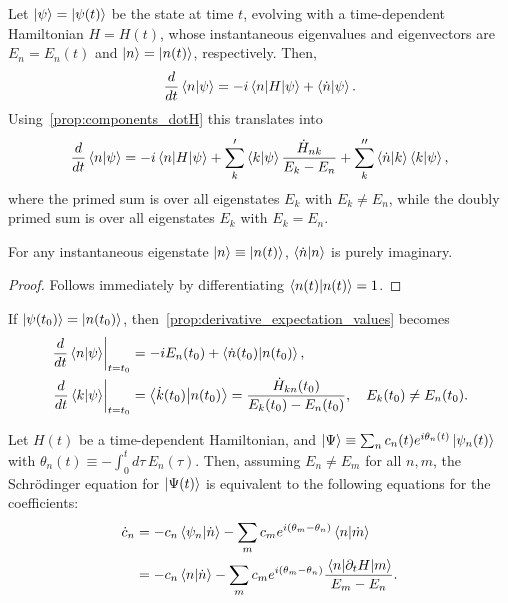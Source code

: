 \documentclass[a4paper]{report}
\begin{document}
\begin{prop}
	Let $\ket\psi=\ket{\psi(t)}$ be the state at time $t$, evolving with a time-dependent Hamiltonian $H=H(t)$, whose instantaneous eigenvalues and eigenvectors are $E_n=E_n(t)$ and $\ket n=\ket{n(t)}$, respectively.
	Then,
	\begin{equation}
		\frac{d}{dt}\braket{n}{\psi} = -i\mel{n}{H}{\psi} + \braket{\dot n}{\psi}.
	\end{equation}
	Using~\cref{prop:components_dotH} this translates into
	\begin{equation}
		\frac{d}{dt}\braket{n}{\psi} =
		- i \mel{n}{H}{\psi}
		+ \sum_k' \braket{k}{\psi} \frac{\dot H_{nk}}{E_k - E_n}
		+ \sum_k'' \braket{\dot n}{k}\braket{k}{\psi},
	\end{equation}
	where the primed sum is over all eigenstates $E_k$ with $E_k\neq E_n$, while the doubly primed sum is over all eigenstates $E_k$ with $E_k=E_n$.
	\label{prop:derivative_expectation_values}
\end{prop}

\begin{prop}
	For any instantaneous eigenstate $\ket n\equiv\ket{n(t)}$, $\braket{\dot n}{n}$ is purely imaginary.
	\label{prop:ndotn_is_purely_imag}
\end{prop}
\begin{proof}
	Follows immediately by differentiating $\braket{n(t)}{n(t)}=1$.
\end{proof}

\begin{prop}
	If $\ket{\psi(t_0)}=\ket{n(t_0)}$, then~\cref{prop:derivative_expectation_values} becomes
	\begin{align}
		\left. \frac{d}{dt}\braket{n}{\psi}\right\rvert_{t=t_0} &= 
		-i E_n(t_0) + \braket{\dot n(t_0)}{n(t_0)}, \\
		\left. \frac{d}{dt}\braket{k}{\psi}\right\rvert_{t=t_0} &= 
		\braket{\dot k(t_0)}{n(t_0)} = \frac{\dot H_{kn}(t_0)}{E_k(t_0)-E_n(t_0)},\quad E_k(t_0)\neq E_n(t_0).
	\end{align}
\end{prop}

\begin{prop}
	Let $H(t)$ be a time-dependent Hamiltonian, and
	$\ket{\Psi}\equiv \sum_n c_n(t)e^{i\theta_n(t)}\ket{\psi_n(t)}$ with
	$\theta_n(t)\equiv-\int_0^t d\tau\,E_n(\tau)$.
	Then, assuming $E_n\neq E_m$ for all $n,m$, the Schr\"{o}dinger equation for $\ket{\Psi(t)}$ is equivalent to the following equations for the coefficients:
	\begin{equation}
	\begin{aligned}
		\dot c_n &= -c_n \braket{\psi_n}{\dot n}
		- \sum_m c_m e^{i(\theta_m-\theta_n)} \braket{ n}{\dot m} \\
		&= -c_n \braket{ n}{\dot n}
		- \sum_m c_m e^{i(\theta_m-\theta_n)} \frac{\mel{n}{\partial_t H}{ m}}{E_m-E_n}.
	\end{aligned}
	\end{equation}
\end{prop}
\end{document}
